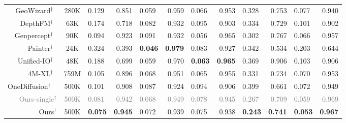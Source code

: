 \begin{table*}[htbp]
{\begin{tabular}{@{}r|c|lr|lr|lr|lr|lr@{}}
    GeoWizard$^\dagger$~\cite{fu2024geowizard}  & 280K & 0.129  & 0.851
     		& 0.059	& 0.959
                & 0.066  & 0.953
     		& 0.328	& 0.753
                & 0.077  & 0.940 
     		\\

    DepthFM$^\dagger$~\cite{gui2024depthfm}  & 63K	& 0.174  & 0.718
     		& 0.082	& 0.932
                & 0.095  & 0.903
     		& 0.334 	& 0.729
                & 0.101  & 0.902
     		\\
    Genpercept$^\dagger$~\cite{xu2024diffusion}  & 90K	& 0.094  & 0.923
     		& 0.091	& 0.932
                & 0.056  & 0.965
     		& 0.302	& 0.767
                & 0.066  & 0.957
     		\\
    \hline
    Painter$^\dagger$~\cite{wang2023images}  & 24K	& 0.324  & 0.393
        & \textbf{0.046}	& \textbf{0.979}
        & 0.083  & 0.927
        & 0.342	& 0.534
        & 0.203  & 0.644
        \\
    Unified-IO$^\dagger$~\cite{lu2022unified}  & 48K	& 0.188  & 0.699
        & 0.059	& 0.970
        & \textbf{0.063}  & \textbf{0.965}
        & 0.369	& 0.906
        & 0.103  & 0.906
        \\
    4M-XL$^\dagger$~\cite{mizrahi20234m}  & 759M	& 0.105 & 0.896
        & 0.068	& 0.951
        & 0.065  & 0.955
        & 0.331	& 0.734
        & 0.070  & 0.953
        \\
    OneDiffusion$^\dagger$ ~\cite{le2024diffusiongenerate} & 500K	& 0.101  & 0.908
        & 0.087	& 0.924
        & 0.094  & 0.906
        & 0.399	& 0.661
        & 0.072  & 0.949
        \\
            
    \hline
    \textcolor{gray}{Ours-single}$^\dagger$  & \textcolor{gray}{500K}	& \textcolor{gray}{0.081}  & \textcolor{gray}{0.942}
     		& \textcolor{gray}{0.068}	& \textcolor{gray}{0.949}
                & \textcolor{gray}{0.078}  & \textcolor{gray}{0.945}
     		& \textcolor{gray}{0.267}	& \textcolor{gray}{0.709}
                & \textcolor{gray}{0.059}  & \textcolor{gray}{0.969}
     		\\
    Ours$^\dagger$  & 500K	& \textbf{0.075}  & \textbf{0.945}
     		& 0.072	& 0.939
                & 0.075  & 0.938
     		& \textbf{0.243}	& \textbf{0.741}
                & \textbf{0.053}  & \textbf{0.967}
     		\\
     
    \bottomrule
  \end{tabular}
  }
  \label{tab:depth}
\end{table*}
